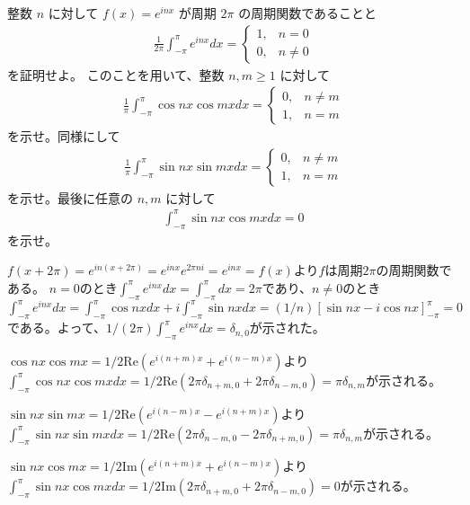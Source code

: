 \begin{renshu}
整数 $n$ に対して $f(x) = e^{inx}$ が周期 $2\pi$ の周期関数であることと
\begin{align}
\frac{1}{2\pi} \int_{-\pi}^{\pi} e^{inx} dx = \left\{
\begin{array}{ll}
1, & n=0 \\
0, & n \ne 0
\end{array}
\right.
\end{align}
を証明せよ。
このことを用いて、整数 $n, m \ge 1$ に対して
\begin{align}
\frac{1}{\pi}\int_{-\pi}^{\pi} \cos nx \cos mx dx = \left\{
\begin{array}{ll}
0, & n \ne m \\
1, & n = m
\end{array}
\right.
\end{align}
を示せ。同様にして
\begin{align}
\frac{1}{\pi} \int_{-\pi}^{\pi} \sin nx \sin mx dx = \left\{
\begin{array}{ll}
0, & n \ne m \\
1, & n = m
\end{array}
\right.
\end{align}
を示せ。最後に任意の $n, m$ に対して
\begin{align}
\int_{-\pi}^{\pi} \sin nx \cos mx dx = 0
\end{align}
を示せ。
\end{renshu}

\begin{kaitou*}
$f(x+2\pi)=e^{in(x+2\pi)}=e^{inx}e^{2\pi ni}=e^{inx}=f(x)$より$f$は周期$2\pi$の周期関数である。
$n=0$のとき$\int_{-\pi}^{\pi} e^{inx} dx=\int_{-\pi}^{\pi}dx=2\pi$であり、$n\neq 0$のとき$\int_{-\pi}^{\pi} e^{inx} dx=\int_{-\pi}^{\pi} \cos nx dx+i\int_{-\pi}^{\pi} \sin nx dx=(1/n)[\sin nx - i \cos nx]_{-\pi}^{\pi}=0$である。よって、$1/(2\pi)\int_{-\pi}^{\pi}e^{inx} dx=\delta_{n, 0}$が示された。

$\cos nx \cos mx=1/2\mathrm{Re}(e^{i(n+m)x}+e^{i(n-m)x})$より$\int_{-\pi}^{\pi}\cos nx \cos mx dx=1/2\mathrm{Re}(2\pi\delta_{n+m,0}+2\pi\delta_{n-m,0})=\pi\delta_{n,m}$が示される。

$\sin nx \sin mx=1/2\mathrm{Re}(e^{i(n-m)x}-e^{i(n+m)x})$より$\int_{-\pi}^{\pi}\sin nx \sin mx dx=1/2\mathrm{Re}(2\pi\delta_{n-m,0}-2\pi\delta_{n+m,0})=\pi\delta_{n,m}$が示される。

$\sin nx \cos mx=1/2\mathrm{Im}(e^{i(n+m)x}+e^{i(n-m)x})$より$\int_{-\pi}^{\pi}\sin nx \cos mx dx=1/2\mathrm{Im}(2\pi\delta_{n+m,0}+2\pi\delta_{n-m,0})=0$が示される。

\end{kaitou*}